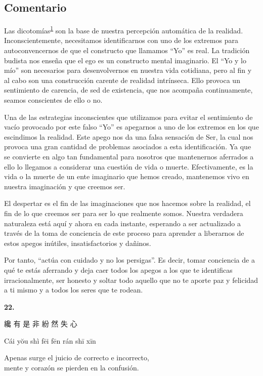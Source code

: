\documentclass[
  a5paperpaper,
]{article}
\begin{document}
\hfill\break

\hypertarget{comentario-20}{%
\subsection{Comentario}\label{comentario-20}}

Las
dicotomías\textsuperscript{\protect\hypertarget{ref1}{\protect\hyperlink{nota1}{1}}}
son la base de nuestra percepción automática de la realidad.
Inconscientemente, necesitamos identificarnos con uno de los extremos
para autoconvencernos de que el constructo que llamamos ``Yo'' es real.
La tradición budista nos enseña que el ego es un constructo mental
imaginario. El ``Yo y lo mío'' son necesarios para desenvolvernos en
nuestra vida cotidiana, pero al fin y al cabo son una construcción
carente de realidad intrínseca. Ello provoca un sentimiento de carencia,
de sed de existencia, que nos acompaña continuamente, seamos conscientes
de ello o no.

Una de las estrategias inconscientes que utilizamos para evitar el
sentimiento de vacío provocado por este falso ``Yo'' es apegarnos a uno
de los extremos en los que escindimos la realidad. Este apego nos da una
falsa sensación de Ser, la cual nos provoca una gran cantidad de
problemas asociados a esta identificación. Ya que se convierte en algo
tan fundamental para nosotros que mantenernos aferrados a ello lo
llegamos a considerar una cuestión de vida o muerte. Efectivamente, es
la vida o la muerte de un ente imaginario que hemos creado, mantenemos
vivo en nuestra imaginación y que creemos ser.

El despertar es el fin de las imaginaciones que nos hacemos sobre la
realidad, el fin de lo que creemos ser para ser lo que realmente somos.
Nuestra verdadera naturaleza está aquí y ahora en cada instante,
esperando a ser actualizado a través de la toma de conciencia de este
proceso para aprender a liberarnos de estos apegos inútiles,
insatisfactorios y dañinos.

Por tanto, ``actúa con cuidado y no los persigas''. Es decir, tomar
conciencia de a qué te estás aferrando y deja caer todos los apegos a
los que te identificas irracionalmente, ser honesto y soltar todo
aquello que no te aporte paz y felicidad a ti mismo y a todos los seres
que te rodean.

\hfill\break

\hypertarget{02}{}
\begin{verseblock}

\newpage

\begin{center}\textbf{22.}\end{center}

纔 有 是 非 紛 然 失 心

Cái yŏu shì fēi fēn rán shī xīn

Apenas surge el juicio de correcto e incorrecto,\\
mente y corazón se pierden en la confusión.

\end{verseblock}
\end{document}
